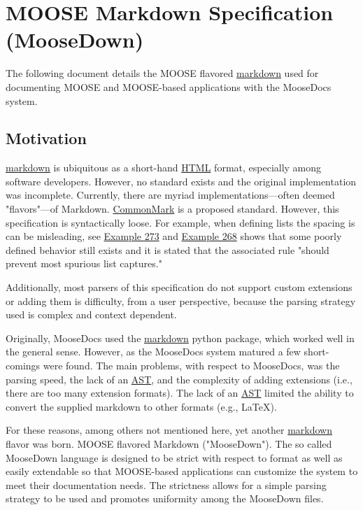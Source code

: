 \documentclass{book}
\begin{document}
\chapter{\label{moose-markdown-specification-(moosedown)}MOOSE Markdown Specification (MooseDown)}
\par
The following document details the MOOSE flavored \href{https://en.wikipedia.org/wiki/Markdown}{markdown} used for documenting MOOSE and MOOSE-based applications with the MooseDocs system.
\section{\label{motivation}Motivation}
\par
\href{https://en.wikipedia.org/wiki/Markdown}{markdown} is ubiquitous as a short-hand \href{https://en.wikipedia.org/wiki/HTML}{HTML} format, especially among software developers. However, no standard exists and the original implementation was incomplete. Currently, there are myriad implementations---often deemed "flavors"---of Markdown. \href{http://commonmark.org/}{CommonMark} is a proposed standard. However, this specification is syntactically loose. For example, when defining lists the spacing is can be misleading, see \href{http://spec.commonmark.org/0.28/\#example-273}{Example 273} and \href{http://spec.commonmark.org/0.28/\#example-268}{Example 268} shows that some poorly defined behavior still exists and it is stated that the associated rule "should prevent most spurious list captures."
\par
Additionally, most parsers of this specification do not support custom extensions or adding them is difficulty, from a user perspective, because the parsing strategy used is complex and context dependent.
\par
Originally, MooseDocs used the \href{http://pythonhosted.org/Markdown/}{markdown} python package, which worked well in the general sense. However, as the MooseDocs system matured a few short-comings were found. The main problems, with respect to MooseDocs, was the parsing speed, the lack of an \href{https://en.wikipedia.org/wiki/Abstract\_syntax\_tree}{AST}, and the complexity of adding extensions (i.e., there are too many extension formats). The lack of an \href{https://en.wikipedia.org/wiki/Abstract\_syntax\_tree}{AST} limited the ability to convert the supplied markdown to other formats (e.g., LaTeX).
\par
For these reasons, among others not mentioned here, yet another \href{https://en.wikipedia.org/wiki/Markdown}{markdown} flavor was born. MOOSE flavored Markdown ("MooseDown"). The so called MooseDown language is designed to be strict with respect to format as well as easily extendable so that MOOSE-based applications can customize the system to meet their documentation needs. The strictness allows for a simple parsing strategy to be used and promotes uniformity among the MooseDown files.
\end{document}
